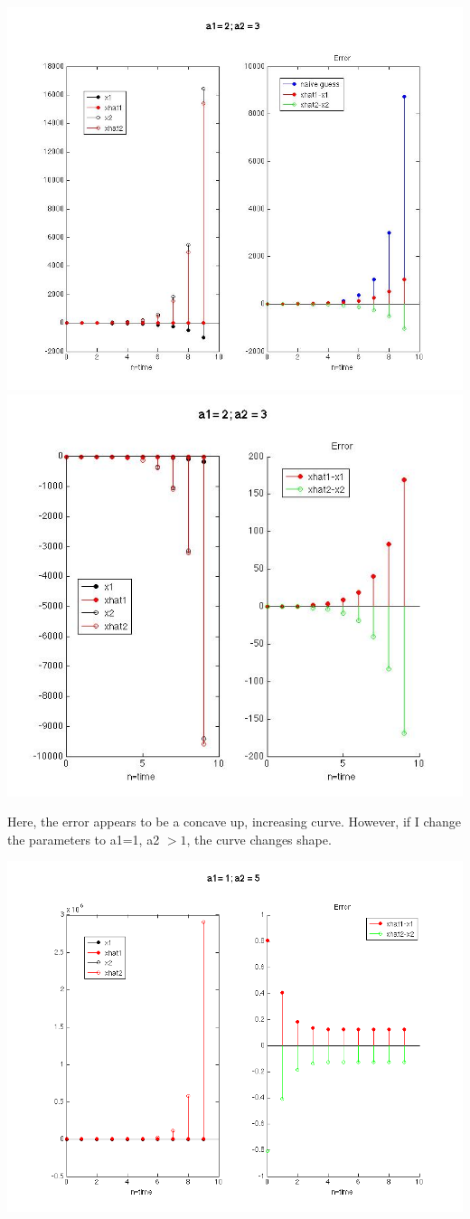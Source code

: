 \documentclass[leqno]{article}
\begin{document}
\begin{center}
\includegraphics[scale=0.3]{fig1_d}\\
\includegraphics[scale=0.4]{fig2_d}
\end{center}

Here, the error appears to be a concave up, increasing curve. However, if I change the parameters to a1=1, a2 $> 1$, the curve changes shape.

\begin{center}
\includegraphics[scale=0.4]{fig3_d}
\end{center}
\end{document}
